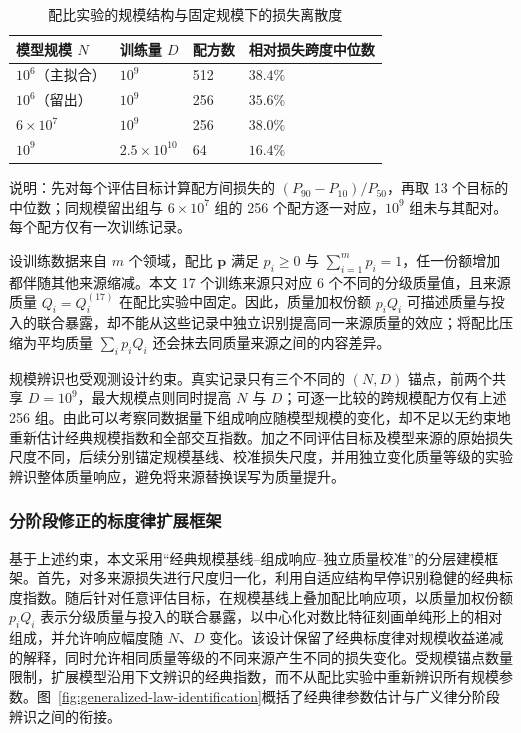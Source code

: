 \documentclass[bwprint]{gmcmthesis}
\newcommand{\TableSetup}{%
    \centering
    \normalsize
    \setlength{\tabcolsep}{5pt}%
    \renewcommand{\arraystretch}{1.13}%
}
\newcommand{\TableNote}[2][0.96\textwidth]{%
    \vspace{0.25em}\par
    \begin{minipage}{#1}
    \normalsize\raggedright #2
    \end{minipage}
}
\begin{document}
\begin{table}[htbp]
    \TableSetup
    \caption{配比实验的规模结构与固定规模下的损失离散度}
    \label{tab:q2_identifiability_data}
    \begin{tabular}{@{}P{3.10cm} C{2.50cm} C{2.00cm} C{3.90cm}@{}}
        \toprule
        模型规模 $N$      & 训练量 $D$            & 配方数 & 相对损失跨度中位数 \\
        \midrule
        $10^6$（主拟合）   & $10^9$             & 512 & $38.4\%$  \\
        $10^6$（留出）    & $10^9$             & 256 & $35.6\%$  \\
        $6\times10^7$ & $10^9$             & 256 & $38.0\%$  \\
        $10^9$        & $2.5\times10^{10}$ & 64  & $16.4\%$  \\
        \bottomrule
    \end{tabular}
    \TableNote{\quad\quad \footnotesize{说明：先对每个评估目标计算配方间损失的 $(P_{90}-P_{10})/P_{50}$，再取 13 个目标的中位数；同规模留出组与 $6\times10^7$ 组的 256 个配方逐一对应，$10^9$ 组未与其配对。每个配方仅有一次训练记录。}}
\end{table}

设训练数据来自 $m$ 个领域，配比 $\mathbf p$ 满足 $p_i\geq0$ 与 $\sum_{i=1}^{m}p_i=1$，任一份额增加都伴随其他来源缩减。本文 17 个训练来源只对应 6 个不同的分级质量值，且来源质量 $Q_i=Q_i^{(17)}$ 在配比实验中固定。因此，质量加权份额 $p_iQ_i$ 可描述质量与投入的联合暴露，却不能从这些记录中独立识别提高同一来源质量的效应；将配比压缩为平均质量 $\sum_i p_iQ_i$ 还会抹去同质量来源之间的内容差异。

规模辨识也受观测设计约束。真实记录只有三个不同的 $(N,D)$ 锚点，前两个共享 $D=10^9$，最大规模点则同时提高 $N$ 与 $D$；可逐一比较的跨规模配方仅有上述 256 组。由此可以考察同数据量下组成响应随模型规模的变化，却不足以无约束地重新估计经典规模指数和全部交互指数。加之不同评估目标及模型来源的原始损失尺度不同，后续分别锚定规模基线、校准损失尺度，并用独立变化质量等级的实验辨识整体质量响应，避免将来源替换误写为质量提升。

\subsubsection{分阶段修正的标度律扩展框架}

基于上述约束，本文采用“经典规模基线--组成响应--独立质量校准”的分层建模框架。首先，对多来源损失进行尺度归一化，利用自适应结构早停识别稳健的经典标度指数。随后针对任意评估目标，在规模基线上叠加配比响应项，以质量加权份额 $p_iQ_i$ 表示分级质量与投入的联合暴露，以中心化对数比特征刻画单纯形上的相对组成，并允许响应幅度随 $N$、$D$ 变化。该设计保留了经典标度律对规模收益递减的解释，同时允许相同质量等级的不同来源产生不同的损失变化。受规模锚点数量限制，扩展模型沿用下文辨识的经典指数，而不从配比实验中重新辨识所有规模参数。图~\ref{fig:generalized-law-identification}概括了经典律参数估计与广义律分阶段辨识之间的衔接。
\end{document}
